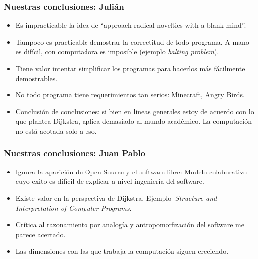 \documentclass[ignorenonframetext,]{beamer}
\begin{document}
\begin{frame}\frametitle{Nuestras conclusiones: Julián}

\begin{itemize}[<+->]
\itemsep1pt\parskip0pt
\item
  Es impracticable la idea de ``approach radical novelties with a blank
  mind''.
\item
  Tampoco es practicable demostrar la correctitud de todo programa. A
  mano es difícil, con computadora es imposible (ejemplo \emph{halting
  problem}).
\item
  Tiene valor intentar simplificar los programas para hacerlos más
  fácilmente demostrables.
\item
  No todo programa tiene requerimientos tan serios: Minecraft, Angry
  Birds.
\item
  Conclusión de conclusiones: si bien en lineas generales estoy de
  acuerdo con lo que plantea Dijkstra, aplica demasiado al mundo
  académico. La computación no está acotada solo a eso.
\end{itemize}

\end{frame}

\begin{frame}\frametitle{Nuestras conclusiones: Juan Pablo}

\begin{itemize}[<+->]
\itemsep1pt\parskip0pt
\item
  Ignora la aparición de Open Source y el software libre: Modelo
  colaborativo cuyo exito es difícil de explicar a nivel ingeniería del
  software.
\item
  Existe valor en la perspectiva de Dijkstra. Ejemplo: \emph{Structure
  and Interpretation of Computer Programs}.
\item
  Crítica al razonamiento por analogía y antropomorfización del software
  me parece acertado.
\item
  Las dimensiones con las que trabaja la computación siguen creciendo.
\end{itemize}

\end{frame}
\end{document}
